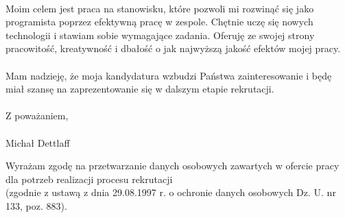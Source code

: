 \documentclass[letterpaper]{article}
\begin{document}
\paragraph{}
\noindent Moim celem jest praca na stanowisku, które pozwoli mi rozwinąć się jako programista poprzez efektywną pracę w zespole. Chętnie uczę się nowych technologii i stawiam sobie wymagające zadania. Oferuję ze swojej strony pracowitość, kreatywność i dbałość o jak najwyższą jakość efektów mojej pracy.

\paragraph{}
Mam nadzieję, że moja kandydatura wzbudzi Państwa zainteresowanie i będę miał szansę na zaprezentowanie się w dalszym etapie rekrutacji.

\paragraph{}
Z poważaniem,
\paragraph{}
Michał Dettlaff

\bigskip
\bigskip

\begin{center}
  \begin{footnotesize}
    Wyrażam zgodę na przetwarzanie danych osobowych zawartych w ofercie pracy dla potrzeb realizacji procesu rekrutacji \\
    (zgodnie z ustawą z dnia 29.08.1997 r. o ochronie danych osobowych Dz. U. nr 133, poz. 883).
  \end{footnotesize}
\end{center}
\end{document}

